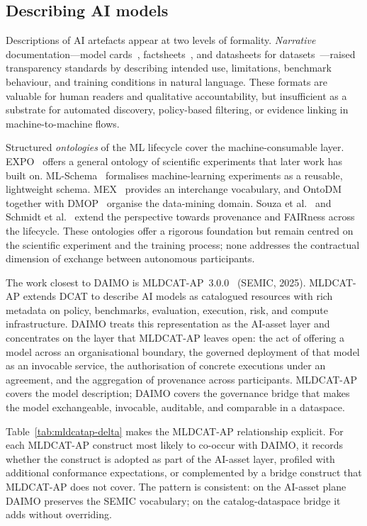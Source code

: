 \documentclass[11pt,a4paper]{article}
\begin{document}
\subsection{Describing AI models}

Descriptions of AI artefacts appear at two levels of formality. \emph{Narrative} documentation---model cards~\cite{mitchell19}, factsheets~\cite{arnold19}, and datasheets for datasets~\cite{gebru21}---raised transparency standards by describing intended use, limitations, benchmark behaviour, and training conditions in natural language. These formats are valuable for human readers and qualitative accountability, but insufficient as a substrate for automated discovery, policy-based filtering, or evidence linking in machine-to-machine flows.

Structured \emph{ontologies} of the ML lifecycle cover the machine-consumable layer. EXPO~\cite{expo} offers a general ontology of scientific experiments that later work has built on. ML-Schema~\cite{mls} formalises machine-learning experiments as a reusable, lightweight schema. MEX~\cite{mex} provides an interchange vocabulary, and OntoDM~\cite{ontodm} together with DMOP~\cite{dmop} organise the data-mining domain. Souza et al.~\cite{souza19} and Schmidt et al.~\cite{schmidt21} extend the perspective towards provenance and FAIRness across the lifecycle. These ontologies offer a rigorous foundation but remain centred on the scientific experiment and the training process; none addresses the contractual dimension of exchange between autonomous participants.

The work closest to DAIMO is MLDCAT-AP~3.0.0~\cite{mldcatap} (SEMIC, 2025). MLDCAT-AP extends DCAT to describe AI models as catalogued resources with rich metadata on policy, benchmarks, evaluation, execution, risk, and compute infrastructure. DAIMO treats this representation as the AI-asset layer and concentrates on the layer that MLDCAT-AP leaves open: the act of offering a model across an organisational boundary, the governed deployment of that model as an invocable service, the authorisation of concrete executions under an agreement, and the aggregation of provenance across participants. MLDCAT-AP covers the model description; DAIMO covers the governance bridge that makes the model exchangeable, invocable, auditable, and comparable in a dataspace.

Table~\ref{tab:mldcatap-delta} makes the MLDCAT-AP relationship explicit. For each MLDCAT-AP construct most likely to co-occur with DAIMO, it records whether the construct is adopted as part of the AI-asset layer, profiled with additional conformance expectations, or complemented by a bridge construct that MLDCAT-AP does not cover. The pattern is consistent: on the AI-asset plane DAIMO preserves the SEMIC vocabulary; on the catalog-dataspace bridge it adds without overriding.
\end{document}
